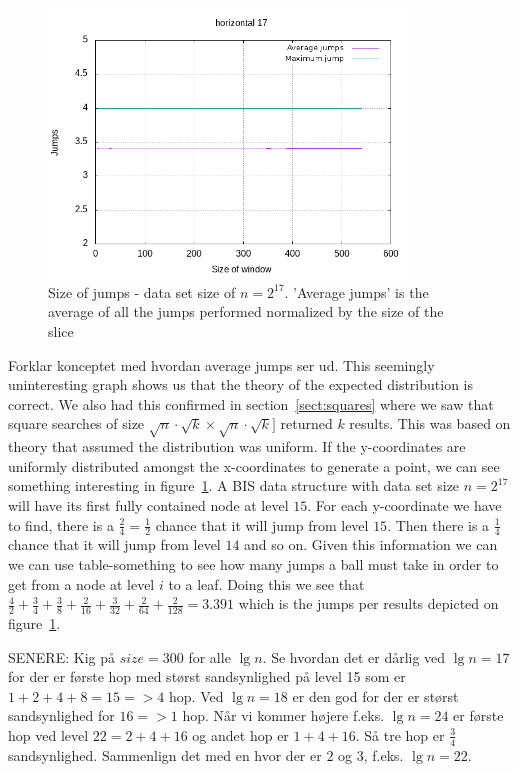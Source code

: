\begin{figure}[h]
    \centering
    \includegraphics[width = 0.85\textwidth]{pictures/analysis/jump_hori_17.png}
    \caption{Size of jumps - data set size of $n=2^{17}$. 'Average jumps' is the average of all the jumps performed normalized by the size of the slice}\label{fig:jump_hori_17}
\end{figure}

Forklar konceptet med hvordan average jumps ser ud. This seemingly uninteresting graph shows us that the theory of the expected distribution is correct. We also had this confirmed in section~\ref{sect:squares} where we saw that square searches of size $\sqrt{n}\cdot\sqrt{k} \times \sqrt{n}\cdot\sqrt{k}]$ returned $k$ results. This was based on theory that assumed the distribution was uniform. If the y-coordinates are uniformly distributed amongst the x-coordinates to generate a point, we can see something interesting in figure~\ref{fig:jump_hori_17}. A BIS data structure with data set size $n = 2^{17}$ will have its first fully contained node at level $15$. For each y-coordinate we have to find, there is a $\frac{2}{4} = \frac{1}{2}$ chance that it will jump from level $15$. Then there is a $\frac{1}{4}$ chance that it will jump from level $14$ and so on. Given this information we can we can use table-something to see how many jumps a ball must take in order to get from a node at level $i$ to a leaf. Doing this we see that $\frac{4}{2} + \frac{3}{4} + \frac{3}{8} + \frac{2}{16} + \frac{3}{32} + \frac{2}{64} + \frac{2}{128} = 3.391$ which is the jumps per results depicted on figure~\ref{fig:jump_hori_17}. 

SENERE: Kig på $size = 300$ for alle $\lg n$. Se hvordan det er dårlig ved $\lg n = 17$ for der er første hop med størst sandsynlighed på level 15 som er $1+2+4+8 = 15 => 4$ hop. Ved $\lg n = 18$ er den god for der er størst sandsynlighed for $16 => 1$ hop. Når vi kommer højere f.eks. $\lg n = 24$ er første hop ved level $22 = 2 + 4 + 16$ og andet hop er $1 + 4 + 16$. Så tre hop er $\frac{3}{4}$ sandsynlighed. Sammenlign det med en hvor der er $2$ og $3$, f.eks. $\lg n = 22$.


